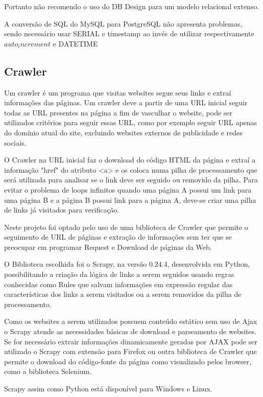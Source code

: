 \documentclass[12pt]{article}
\begin{document}
Portanto não recomendo o uso do DB Design para um modelo relacional extenso. 

A conversão de SQL do MySQL para PostgreSQL não apresenta problemas, sendo necessário usar SERIAL e timestamp ao invés de utilizar respectivamente $auto_increment$ e DATETIME


\subsection{Crawler}

Um crawler é um programa que visitas websites segue seus links e extraí informações das páginas. Um crawler deve a partir de uma URL inicial seguir todas as URL presentes na página a fim de vasculhar o website, 
pode ser utilizados critérios para seguir essas URL, como por exemplo seguir URL apenas do domínio atual do site, excluindo websites externos de publicidade e redes sociais.

O Crawler na URL inicial faz o download do código HTML da página e extraí a informação "href" do atributo <a> e os coloca numa pilha de processamento que será utilizada para analisar se o link deve ser seguido ou removido da pilha. 
Para evitar o problema de loops infinitos quando uma página A possui um link para uma página B e a página B possui link para a página A, deve-se criar uma pilha de links já visitados para verificação.   
 
Neste projeto foi optado pelo uso de uma biblioteca de Crawler que permite o seguimento de URL de páginas e extração de informações sem ter que se preocupar em programar Request e Download de páginas da Web.

O Biblioteca escolhida foi o Scrapy, na versão 0.24.4, desenvolvida em Python, possibilitando a criação da lógica de links a serem seguidos usando regras conhecidas como Rules que salvam informações em expressão regular das características dos links a serem visitados ou a serem removidos da pilha de processamento.
 
Como os websites a serem utilizados possuem conteúdo estático sem uso de Ajax o Scrapy atende as necessidades básicas de download e parseamento de websites. Se for necessário extrair informações dinamicamente geradas por AJAX pode ser utilizado o Scrapy com extensão para Firefox ou outra biblioteca de Crawler que permite o download do código-fonte da página como visualizado pelos browser, como a biblioteca Selenium.

Scrapy assim como Python está disponível para Windows e Linux.
\end{document}
